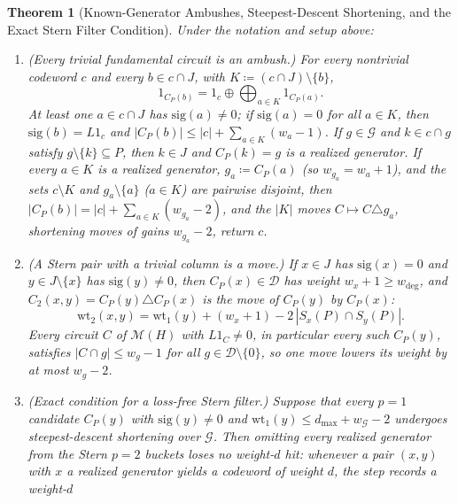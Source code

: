 \documentclass[12pt]{article}
\newtheorem{theorem}{Theorem}
\theoremstyle{definition}
\newcommand{\Dc}{\mathcal{D}}
\newcommand{\Gc}{\mathcal{G}}
\begin{document}
\begin{theorem}[Known-Generator Ambushes, Steepest-Descent Shortening, and the Exact Stern Filter
  Condition]\label{thm:known_gen}
Under the notation and setup above:
\begin{enumerate}[label=(\alph*)]
  \item \emph{(Every trivial fundamental circuit is an ambush.)} For every nontrivial codeword $c$ and every $b \in c
    \cap J$, with $K \coloneqq (c \cap J) \setminus \{b\}$,
    \begin{equation}\label{eq:general_ambush}
      1_{C_P(b)} = 1_c \oplus \bigoplus_{a \in K} 1_{C_P(a)}.
    \end{equation}
    At least one $a \in c \cap J$ has $\mathrm{sig}(a) \neq 0$; if $\mathrm{sig}(a) = 0$ for all $a \in K$, then
    $\mathrm{sig}(b) = L 1_c$ and $|C_P(b)| \le |c| + \sum_{a \in K} (w_a - 1)$. If $g \in \Gc$ and $k \in c \cap g$
    satisfy $g \setminus \{k\} \subseteq P$, then $k \in J$ and $C_P(k) = g$ is a realized generator. If every $a \in
    K$ is a realized generator, $g_a \coloneqq C_P(a)$ (so $w_{g_a} = w_a + 1$), and the sets $c \setminus K$ and $g_a
    \setminus \{a\}$ ($a \in K$) are pairwise disjoint, then $|C_P(b)| = |c| + \sum_{a \in K} (w_{g_a} - 2)$, and the
    $|K|$ moves $C \mapsto C \triangle g_a$, shortening moves of gains $w_{g_a} - 2$, return $c$.
  \item \emph{(A Stern pair with a trivial column is a move.)} If $x \in J$ has $\mathrm{sig}(x) = 0$ and $y \in J
    \setminus \{x\}$ has $\mathrm{sig}(y) \neq 0$, then $C_P(x) \in \Dc$ has weight $w_x + 1 \ge w_{\deg}$, and
    $C_2(x, y) = C_P(y) \triangle C_P(x)$ is the move of $C_P(y)$ by $C_P(x)$:
    \begin{equation}\label{eq:pair_move}
      \mathrm{wt}_2(x, y) = \mathrm{wt}_1(y) + (w_x + 1) - 2\,|S_x(P) \cap S_y(P)|.
    \end{equation}
    Every circuit $C$ of $\mathcal{M}(H)$ with $L 1_C \neq 0$, in particular every such $C_P(y)$, satisfies $|C \cap g|
    \le w_g - 1$ for all $g \in \Dc \setminus \{0\}$, so one move lowers its weight by at most $w_g - 2$.
  \item \emph{(Exact condition for a loss-free Stern filter.)} Suppose that every $p = 1$ candidate $C_P(y)$ with
    $\mathrm{sig}(y) \neq 0$ and $\mathrm{wt}_1(y) \le d_{\max} + w_{\Gc} - 2$ undergoes steepest-descent shortening
    over $\Gc$. Then omitting every realized generator from the Stern $p = 2$ buckets loses no weight-$d$ hit: whenever
    a pair $(x, y)$ with $x$ a realized generator yields a codeword of weight $d$, the step records a weight-$d$

\end{enumerate}
\end{theorem}
\end{document}
